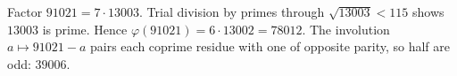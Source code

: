 Factor $91021=7\cdot13003$. Trial division by primes through $\sqrt{13003}<115$ shows $13003$ is prime. Hence $\varphi(91021)=6\cdot13002=78012$. The involution $a\mapsto91021-a$ pairs each coprime residue with one of opposite parity, so half are odd: $\boxed{39006}$.
